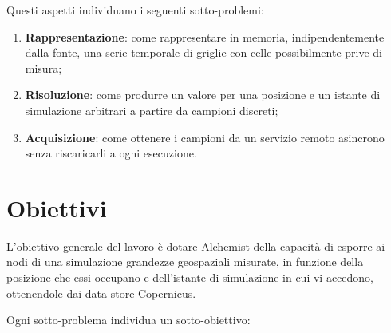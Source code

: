 Questi aspetti individuano i seguenti sotto-problemi:

\begin{enumerate}
    \item \textbf{Rappresentazione}: come rappresentare in memoria, indipendentemente dalla fonte, una serie temporale di griglie con
    celle possibilmente prive di misura;
    \item \textbf{Risoluzione}: come produrre un valore per una posizione e un istante di simulazione arbitrari
    a partire da campioni discreti;
    \item \textbf{Acquisizione}: come ottenere i campioni da un servizio remoto asincrono senza riscaricarli a ogni esecuzione.
\end{enumerate}

\section{Obiettivi}
\label{sec:obiettivi}

L'obiettivo generale del lavoro è dotare Alchemist della capacità di esporre ai nodi
di una simulazione grandezze geospaziali misurate, in funzione della posizione che essi
occupano e dell'istante di simulazione in cui vi accedono, ottenendole dai data store
Copernicus.

Ogni sotto-problema individua un sotto-obiettivo:

